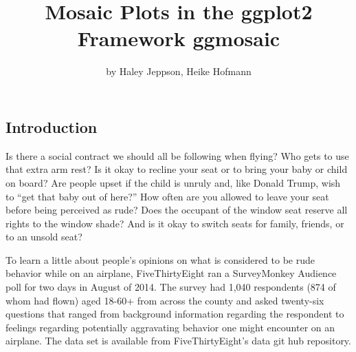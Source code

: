 \title{Mosaic Plots in the ggplot2 Framework ggmosaic}
\author{by Haley Jeppson, Heike Hofmann}

\maketitle


\subsection{Introduction}\label{introduction}

Is there a social contract we should all be following when flying? Who
gets to use that extra arm rest? Is it okay to recline your seat or to
bring your baby or child on board? Are people upset if the child is
unruly and, like Donald Trump, wish to ``get that baby out of here?''
\citep{cnn} How often are you allowed to leave your seat before being
perceived as rude? Does the occupant of the window seat reserve all
rights to the window shade? And is it okay to switch seats for family,
friends, or to an unsold seat?

To learn a little about people's opinions on what is considered to be
rude behavior while on an airplane, FiveThirtyEight ran a SurveyMonkey
Audience poll for two days in August of 2014. \citep{fivethirtyeight}
The survey had 1,040 respondents (874 of whom had flown) aged 18-60+
from across the county and asked twenty-six questions that ranged from
background information regarding the respondent to feelings regarding
potentially aggravating behavior one might encounter on an airplane. The
data set is available from FiveThirtyEight's data git hub repository.

